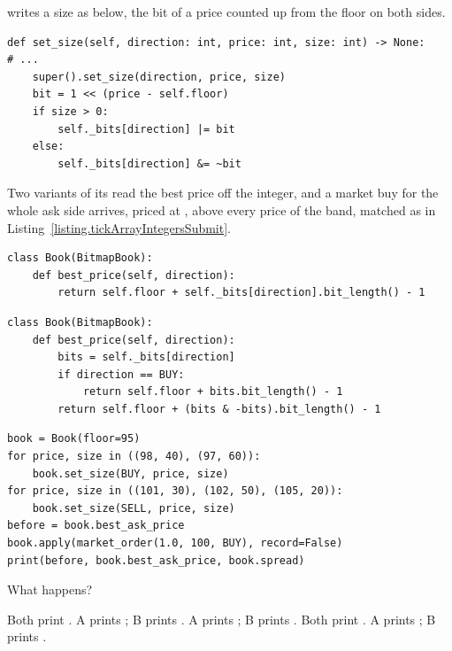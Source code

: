 \begin{question}
\label{question.bitmapBestAskFromTheWrongEnd}
 writes a size as below,
the bit of a price counted up from the floor on both sides.
\begin{lstlisting}[caption={\protect\codehl{unito26.lob.orderbook.BitmapBook.set\_size}, abridged.}, label=listing.bitmapBestAskSetSize]
def set_size(self, direction: int, price: int, size: int) -> None:
# ...
    super().set_size(direction, price, size)
    bit = 1 << (price - self.floor)
    if size > 0:
        self._bits[direction] |= bit
    else:
        self._bits[direction] &= ~bit
\end{lstlisting}
Two variants of its  read the best price off the integer,
and a market buy for the whole ask side arrives,
priced at , above every price of the band,
matched as in Listing~\ref{listing.tickArrayIntegersSubmit}.
\begin{lstlisting}[caption={Alternative A}, label=listing.bitmapBestAskA]
class Book(BitmapBook):
    def best_price(self, direction):
        return self.floor + self._bits[direction].bit_length() - 1
\end{lstlisting}
\begin{lstlisting}[caption={Alternative B}, label=listing.bitmapBestAskB]
class Book(BitmapBook):
    def best_price(self, direction):
        bits = self._bits[direction]
        if direction == BUY:
            return self.floor + bits.bit_length() - 1
        return self.floor + (bits & -bits).bit_length() - 1
\end{lstlisting}
\begin{lstlisting}[caption={Run once with each alternative}, label=listing.bitmapBestAskRun]
book = Book(floor=95)
for price, size in ((98, 40), (97, 60)):
    book.set_size(BUY, price, size)
for price, size in ((101, 30), (102, 50), (105, 20)):
    book.set_size(SELL, price, size)
before = book.best_ask_price
book.apply(market_order(1.0, 100, BUY), record=False)
print(before, book.best_ask_price, book.spread)
\end{lstlisting}
What happens?
\begin{choices}
 \choice Both print .
 \correctchoice A prints ; B prints .
 \choice A prints ; B prints .
 \choice Both print .
 \choice A prints ; B prints .
\end{choices}
\end{question}

